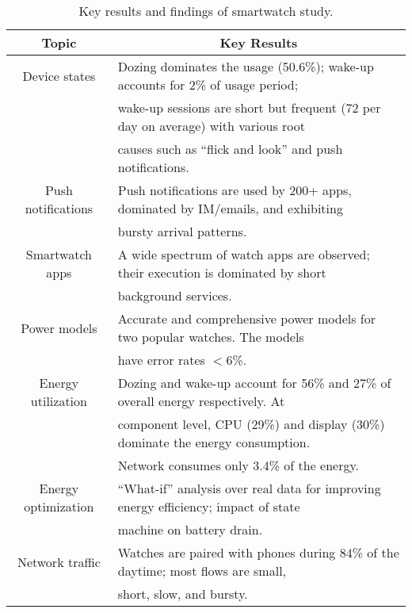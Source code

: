 \begin{table}[t]
\centering
\footnotesize
\begin{tabular}{c|l}
\multicolumn{1}{c|}{Topic}  & \multicolumn{1}{c}{Key Results} \\
\hline
 Device states & Dozing dominates the usage (50.6\%); wake-up accounts for 2\% of usage period; \\& wake-up sessions are short but frequent (72 per day on average) with various root \\& causes  such as ``flick and look'' and push notifications. \\
\hline
 Push notifications  & Push notifications are used by 200+ apps, dominated by IM/emails, and exhibiting \\& bursty arrival patterns.  \\
\hline
 Smartwatch apps     & A wide spectrum of watch apps are observed; their execution is dominated by short \\& background services. \\
\hline
 Power models        & Accurate and comprehensive power models for two popular watches. The models \\& have error rates $<$6\%. \\
\hline
 Energy utilization  & Dozing and wake-up account for 56\% and 27\% of overall energy respectively. At \\& component level, CPU (29\%) and display (30\%) dominate the energy consumption. \\& Network consumes only 3.4\% of the energy. \\
\hline
 Energy optimization & ``What-if'' analysis over real data for improving energy efficiency; impact of state \\& machine on battery drain. \\
\hline
 Network traffic     & Watches are paired with phones during 84\% of the daytime; most flows are small, \\& short, slow, and bursty. \\
\end{tabular}
\caption{\footnotesize Key results and findings of smartwatch study.}
\label{tab:toc}
\end{table}